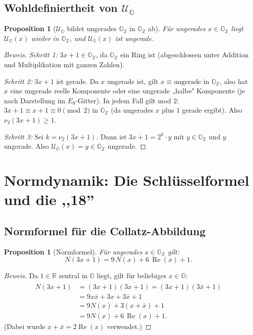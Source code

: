 \documentclass[12pt,a4paper]{article}
\newtheorem{proposition}[definition]{Proposition}
\newenvironment{beweis}{\begin{proof}[Beweis]}{\end{proof}}
\newcommand{\vii}{\nu_2}           %
\newcommand{\OZ}{\mathbb{O}_{\mathbb{Z}}}  %
\newcommand{\OO}{\mathbb{O}}       %
\newcommand{\Norm}[1]{N(#1)}       %
\renewcommand{\Re}{\operatorname{Re}}
\newcommand{\R}{\mathbb{R}}
\newcommand{\Uo}{\mathcal{U}_{\mathbb{O}}} %
\begin{document}
\subsection{Wohldefiniertheit von \texorpdfstring{$\Uo$}{U\_O}}

\begin{proposition}[$\Uo$ bildet ungerades $\OZ$ in $\OZ$ ab]\label{prop:wohldefiniert}
Für ungerades $x \in \OZ$ liegt $\Uo(x)$ wieder in $\OZ$, und
$\Uo(x)$ ist ungerade.
\end{proposition}

\begin{beweis}
\textit{Schritt 1:} $3x + 1 \in \OZ$, da $\OZ$ ein Ring ist (abgeschlossen
unter Addition und Multiplikation mit ganzen Zahlen).

\textit{Schritt 2:} $3x + 1$ ist gerade. Da $x$ ungerade ist, gilt
$x \equiv \text{ungerade}$ in $\OZ$, also hat $x$ eine ungerade reelle Komponente
oder eine ungerade „halbe" Komponente (je nach Darstellung im $E_8$-Gitter).
In jedem Fall gilt mod 2: $3x+1 \equiv x + 1 \equiv 0 \pmod 2$ in $\OZ$
(da ungerades $x$ plus $1$ gerade ergibt). Also $\vii(3x+1) \geq 1$.

\textit{Schritt 3:} Sei $k = \vii(3x+1)$. Dann ist $3x+1 = 2^k \cdot y$
mit $y \in \OZ$ und $y$ ungerade. Also $\Uo(x) = y \in \OZ$ ungerade.
\end{beweis}

\section{Normdynamik: Die Schlüsselformel und die \texorpdfstring{,,18''}{18}}

\subsection{Normformel für die Collatz-Abbildung}

\begin{proposition}[Normformel]\label{prop:normformel}
Für ungerades $x \in \OZ$ gilt:
\[
  \Norm{3x+1} = 9\,\Norm{x} + 6\,\Re(x) + 1.
\]
\end{proposition}

\begin{beweis}
Da $1 \in \R$ zentral in $\OO$ liegt, gilt für beliebiges $x \in \OO$:
\begin{align*}
  \Norm{3x+1} &= (3x+1)\overline{(3x+1)} = (3x+1)(3\bar{x}+1)\\
  &= 9 x\bar{x} + 3x + 3\bar{x} + 1\\
  &= 9\Norm{x} + 3(x + \bar{x}) + 1\\
  &= 9\Norm{x} + 6\,\Re(x) + 1.
\end{align*}
(Dabei wurde $x + \bar{x} = 2\Re(x)$ verwendet.)
\end{beweis}
\end{document}
